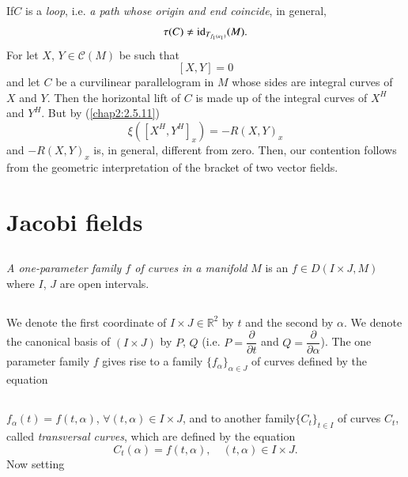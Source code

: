 \subsection{}\label{chap2:2.7.11}

\begin{remark*}
If\pageoriginale $C$ is a {\em loop}, i.e. {\em a path whose origin
  and end coincide}, in general,
$$
\tau(C)\neq \operatorname{id}_{T_{f_{1}(a_{1})}}(M).
$$
For let $X$, $Y\in \mathscr{C}(M)$ be such that
$$
[X,Y]=0
$$
and let $C$ be a curvilinear parallelogram in $M$ whose sides are
integral curves of $X$ and $Y$. Then the horizontal lift of $C$ is
made up of the integral curves of $X^{H}$ and $Y^{H}$. But by
(\ref{chap2:2.5.11})
$$
\xi([X^{H},Y^{H}]_{x})=-R(X,Y)_{x}
$$
and $-R(X,Y)_{x}$ is, in general, different from zero. Then, our
contention follows from the geometric interpretation of the bracket of
two vector fields.
\end{remark*}

\section{Jacobi fields}\label{chap2:sec8}

\subsection{}\label{chap2:2.8.1}

\begin{defi*}
{\em A one-parameter family $f$ of curves in a manifold} $M$ is an
$f\in D(I\times J,M)$ where $I$, $J$ are open intervals.
\end{defi*}


\subsection{}\label{chap2:2.8.2}
We denote the first coordinate of $I\times J\in \mathbb{R}^{2}$ by $t$
and the second by $\alpha$. We denote the canonical basis of $(I\times
J)$ by $P$, $Q$ (i.e. $P=\dfrac{\partial}{\partial t}$ and
$Q=\dfrac{\partial}{\partial\alpha}$). The one parameter family $f$
gives rise to a family $\{f_{\alpha}\}_{\alpha\in J}$ of curves
defined by the equation

\subsection{}\label{chap2:2.8.3}
$f_{\alpha}(t)=f(t,\alpha)$, $\forall(t,\alpha)\in I\times J$, and to
another family\pageoriginale $\{C_{t}\}_{t\in I}$ of curves $C_{t}$,
called {\em transversal curves}, which are defined by the equation
\begin{equation*}
C_{t}(\alpha)=f(t,\alpha),\quad (t,\alpha)\in I\times J.\tag{2.8.4}\label{chap2:2.8.4}
\end{equation*}
Now setting

